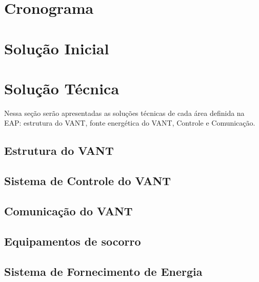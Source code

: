 \section{Cronograma}
  

\section{Solução Inicial}
  

\section{Solução Técnica}
  Nessa seção serão apresentadas as soluções técnicas de cada área definida na EAP: estrutura do VANT,
  fonte energética do VANT, Controle e Comunicação.

\subsection{Estrutura do VANT}
  
  
\subsection{Sistema de Controle do VANT}
  

\subsection{Comunicação do VANT}
  

 \subsection{Equipamentos de socorro}
  

\subsection{Sistema de Fornecimento de Energia}
  



